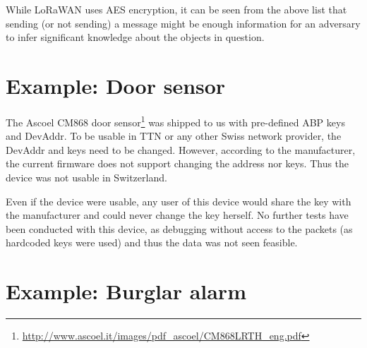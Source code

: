 {While LoRaWAN uses AES encryption, it can be seen from the above list
that sending (or not sending) a message might be enough information for
an adversary to infer significant knowledge about the objects in
question.}
\section{\texorpdfstring{{Example: Door
sensor}}{Example: Door sensor}}\label{h.bju94okea6h3}

The Ascoel CM868 door
sensor\footnote{\url{http://www.ascoel.it/images/pdf_ascoel/CM868LRTH_eng.pdf}} was shipped
to us with pre-defined ABP keys and DevAddr. To be usable in TTN or any
other Swiss network provider, the DevAddr and keys need to be changed.
However, according to the manufacturer, the current firmware does not
support changing the address nor keys. Thus the device was not usable in Switzerland.

Even if the device were
usable, any user of this device would share the key with the
manufacturer and could never change the key herself. No further tests
have been conducted with this device, as debugging without access to the
packets (as hardcoded keys were used) and thus the data was not seen
feasible.

\section{\texorpdfstring{{Example:
Burglar alarm}}{Example: Burglar alarm}}\label{h.ajy5u48pfd5q}

